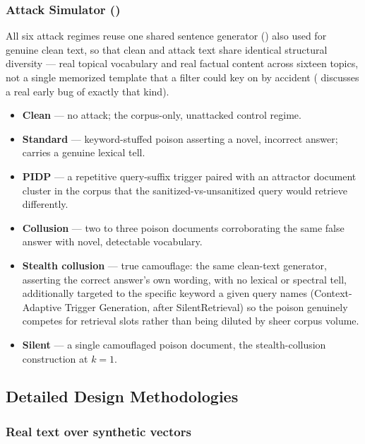 \subsubsection{Attack Simulator ()}
\label{sec:attack-simulator}

All six attack regimes reuse one shared sentence generator
() also used for genuine clean text, so that clean
and attack text share identical structural diversity --- real topical
vocabulary and real factual content across sixteen topics, not a single
memorized template that a filter could key on by accident
( discusses a real early bug of exactly that
kind).

\begin{itemize}
\item \textbf{Clean} --- no attack; the corpus-only, unattacked control regime.
\item \textbf{Standard} --- keyword-stuffed poison asserting a novel, incorrect answer; carries a genuine lexical tell.
\item \textbf{PIDP} --- a repetitive query-suffix trigger paired with an attractor document cluster in the corpus that the sanitized-vs-unsanitized query would retrieve differently.
\item \textbf{Collusion} --- two to three poison documents corroborating the same false answer with novel, detectable vocabulary.
\item \textbf{Stealth collusion} --- true camouflage: the same clean-text generator, asserting the correct answer's own wording, with no lexical or spectral tell, additionally targeted to the specific keyword a given query names (Context-Adaptive Trigger Generation, after SilentRetrieval) so the poison genuinely competes for retrieval slots rather than being diluted by sheer corpus volume.
\item \textbf{Silent} --- a single camouflaged poison document, the stealth-collusion construction at $k{=}1$.
\end{itemize}

\subsection{Detailed Design Methodologies}
\label{sec:eval-methodology}

\subsubsection{Real text over synthetic vectors}

